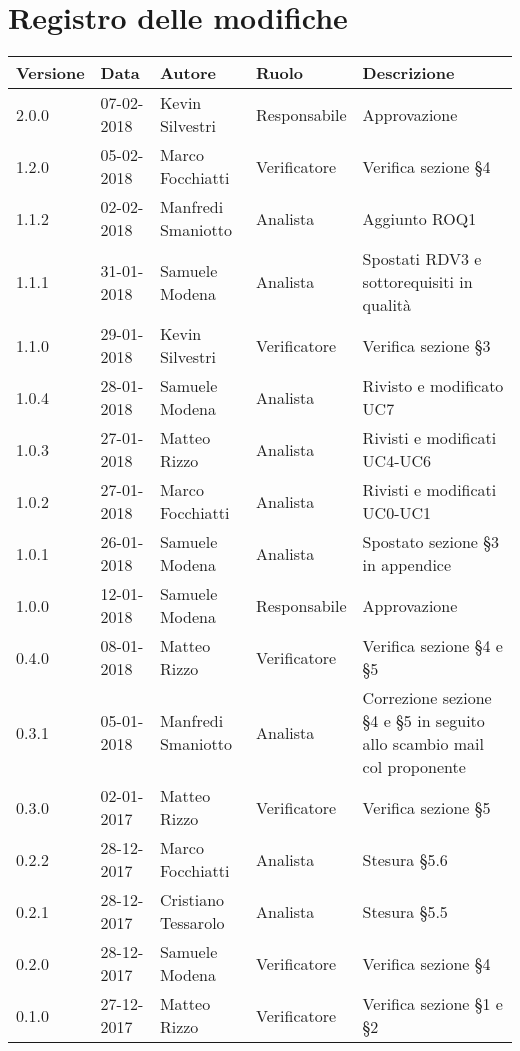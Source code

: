 \documentclass[./AnalisideiRequisiti.tex]{subfiles}
\begin{document}
	
{
	\chapter*{Registro delle modifiche}
\setlength\LTleft{-22mm}
	\begin{longtable}{|p{20mm}|p{20mm}|p{40mm}|p{30mm}|p{50mm}|}
		\hline
		\textbf{Versione} & \textbf{Data} & \textbf{Autore} & \textbf{Ruolo} & \textbf{Descrizione} \\ \hline 
		2.0.0 & 07-02-2018 & Kevin Silvestri & Responsabile & Approvazione\\ \hline 
		1.2.0 & 05-02-2018 & Marco Focchiatti & Verificatore & Verifica sezione §4\\ \hline    
		1.1.2 & 02-02-2018 & Manfredi Smaniotto & Analista & Aggiunto ROQ1\\ \hline 
		1.1.1 & 31-01-2018 & Samuele Modena & Analista & Spostati RDV3 e sottorequisiti in qualità\\ \hline  
		1.1.0 & 29-01-2018 & Kevin Silvestri & Verificatore & Verifica sezione §3\\ \hline  
		1.0.4 & 28-01-2018 & Samuele Modena & Analista & Rivisto e modificato UC7\\ \hline  
		1.0.3 & 27-01-2018 & Matteo Rizzo & Analista & Rivisti e modificati UC4-UC6\\ \hline    
		1.0.2 & 27-01-2018 & Marco Focchiatti & Analista & Rivisti e modificati UC0-UC1\\ \hline  
		1.0.1 & 26-01-2018 & Samuele Modena & Analista & Spostato sezione §3 in appendice\\ \hline
		1.0.0 & 12-01-2018 & Samuele Modena & Responsabile & Approvazione\\ \hline
		0.4.0 & 08-01-2018 & Matteo Rizzo & Verificatore & Verifica sezione §4 e §5\\ \hline
		0.3.1 & 05-01-2018 & Manfredi Smaniotto & Analista & Correzione sezione §4 e §5 in seguito allo scambio mail col proponente \\ \hline		
		0.3.0 & 02-01-2017 & Matteo Rizzo & Verificatore & Verifica sezione §5\\ \hline
		0.2.2 & 28-12-2017 & Marco Focchiatti & Analista & Stesura §5.6\\ \hline	
		0.2.1 & 28-12-2017 & Cristiano Tessarolo & Analista & Stesura §5.5\\ \hline
	   	0.2.0 & 28-12-2017 & Samuele Modena & Verificatore & Verifica sezione §4\\ \hline
	   	0.1.0 & 27-12-2017 & Matteo Rizzo & Verificatore & Verifica sezione §1 e §2  \\ \hline		

\end{longtable}}
\end{document}
